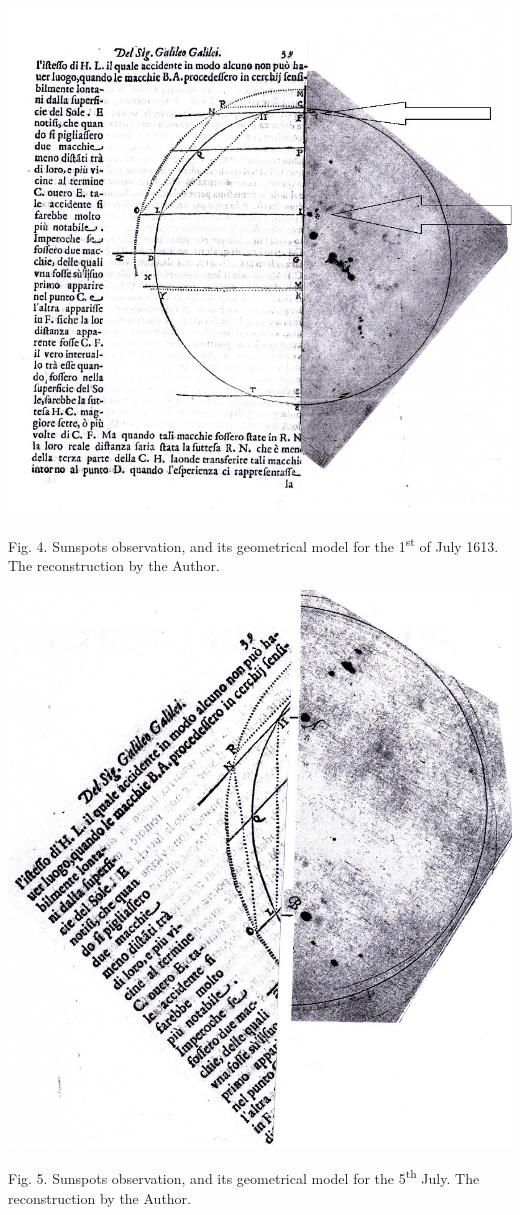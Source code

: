 \documentclass[a4paper]{article}
\begin{document}
{\centering  \includegraphics{Sierotowiczorg-img004.jpg} \par}
{\centering
Fig. 4. Sunspots observation, and its geometrical model for the 1\textsuperscript{st} of July 1613. The reconstruction
by the Author.
\par}

{\centering  \includegraphics{Sierotowiczorg-img005.jpg} \par}
{\centering
Fig. 5. Sunspots observation, and its geometrical model for the 5\textsuperscript{th} July. The reconstruction by the
Author.
\par}
\end{document}

